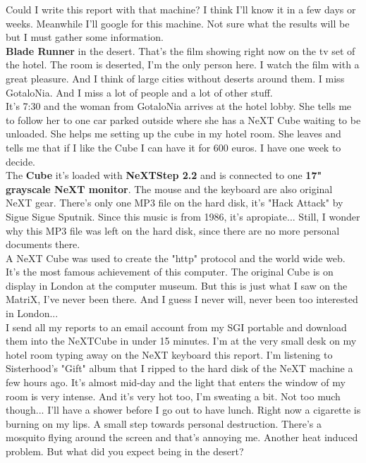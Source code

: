 \documentclass[11pt,twoside,a4paper]{book}
\begin{document}
\begin{multicols*}{2}
Could I write this report with that machine? I think I'll know it in a few days or weeks. Meanwhile I'll google for this machine. Not sure what the results will be but I must gather some information. ~\\

\textbf{Blade Runner} in the desert. That's the film showing right now on the tv set of the hotel. The room is deserted, I'm the only person here. I watch the film with a great pleasure. And I think of large cities without deserts around them. I miss GotaloNia. And I miss a lot of people and a lot of other stuff. ~\\

It's 7:30 and the woman from GotaloNia arrives at the hotel lobby. She tells me to follow her to one car parked outside where she has a NeXT Cube waiting to be unloaded. She helps me setting up the cube in my hotel room. She leaves and tells me that if I like the Cube I can have it for 600 euros. I have one week to decide. ~\\

The \textbf{Cube} it's loaded with \textbf{NeXTStep 2.2} and is connected to one \textbf{17" grayscale NeXT monitor}. The mouse and the keyboard are also original NeXT gear. There's only one MP3 file on the hard disk, it's "Hack Attack" by Sigue Sigue Sputnik. Since this music is from 1986, it's apropiate... Still, I wonder why this MP3 file was left on the hard disk, since there are no more personal documents there. ~\\

A NeXT Cube was used to create the "http" protocol and the world wide web. It's the most famous achievement of this computer. The original Cube is on display in London at the computer museum. But this is just what I saw on the MatriX, I've never been there. And I guess I never will, never been too interested in London... ~\\

I send all my reports to an email account from my SGI portable and download them into the NeXTCube in under 15 minutes. I'm at the very small desk on my hotel room typing away on the NeXT keyboard this report. I'm listening to Sisterhood's "Gift" album that I ripped to the hard disk of the NeXT machine a few hours ago. It's almost mid-day and the light that enters the window of my room is very intense. And it's very hot too, I'm sweating a bit. Not too much though... I'll have a shower before I go out to have lunch. Right now a cigarette is burning on my lips. A small step towards personal destruction. There's a mosquito flying around the screen and that's annoying me. Another heat induced problem. But what did you expect being in the desert? ~\\


\end{multicols*}
\end{document}
